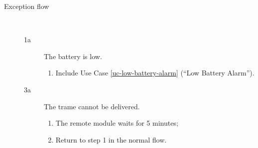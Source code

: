 \begin{description}
	\item[Exception flow] \ 
	\begin{description}
		\item[1a] The battery is low.
		\begin{enumerate}
			\item Include Use Case \ref{uc-low-battery-alarm} (``Low Battery Alarm'').
		\end{enumerate}
		\item[3a] The trame cannot be delivered.
		\begin{enumerate}
			\item The remote module waits for 5 minutes;
			\item Return to step 1 in the normal flow.  
		\end{enumerate}
	\end{description}
\end{description}
